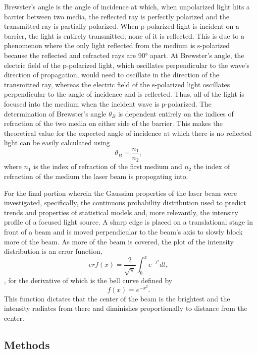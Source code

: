 \documentclass[11pt]{article}
\begin{document}
Brewster's angle is the angle of incidence at which, when unpolarized
light hits a barrier between two media, the reflected ray is perfectly
polarized and the transmitted ray is partially polarized. When
p-polarized light is incident on a barrier, the light is entirely
transmitted; none of it is reflected. This is due to a phenomenon where
the only light reflected from the medium is s-polarized because the
reflected and refracted rays are 90° apart. At Brewster's angle, the
electric field of the p-polarized light, which oscillates perpendicular
to the wave's direction of propagation, would need to oscillate in the
direction of the transmitted ray, whereas the electric field of the
s-polarized light oscillates perpendicular to the angle of incidence and
is reflected. Thus, all of the light is focused into the medium when the
incident wave is p-polarized. The determination of Brewster's angle
\(\theta_B\) is dependent entirely on the indices of refraction of the
two media on either side of the barrier. This makes the theoretical
value for the expected angle of incidence at which there is no reflected
light can be easily calculated using
\[\theta_{B} = \frac{n_{1}}{n_{2}}, \tag{2}\] where \(n_1\) is the index
of refraction of the first medium and \(n_2\) the index of refraction of
the medium the laser beam is propogating into.

For the final portion wherein the Gaussian properties of the laser beam
were investigated, specifically, the continuous probability distribution
used to predict trends and properties of statistical models and, more
relevantly, the intensity profile of a focused light source. A sharp
edge is placed on a translational stage in front of a beam and is moved
perpendicular to the beam's axis to slowly block more of the beam. As
more of the beam is covered, the plot of the intensity distribution is
an error function,
\[erf(x) = \frac{2}{\sqrt{\pi}}\int_0^x e^{-t^2} dt , \tag{3}\], for the
derivative of which is the bell curve defined by
\[f(x) = e^{-x^2}. \tag{4}\] This function dictates that the center of
the beam is the brightest and the intensity radiates from there and
diminishes proportionally to distance from the center.

    \hypertarget{methods}{%
\subsection{Methods}\label{methods}}
\end{document}
